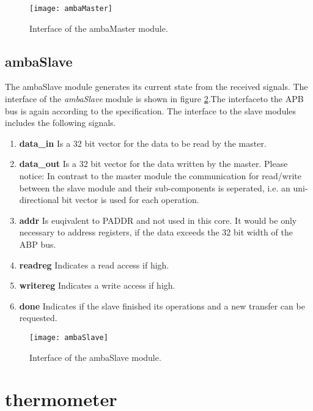 \documentclass[%
	a4paper,
]
{article}
\begin{document}
\begin{figure}[h!]
	\centering
	\texttt{[image: ambaMaster]}
	\caption{Interface of the ambaMaster module.}
	\label{fig:ambaMaster}
\end{figure}

\subsection{ambaSlave}
The ambaSlave module generates its current state from the received signals. The interface of the \textit{ambaSlave} module is shown in figure \ref{fig:ambaSlave}.The interfaceto the APB bus is again according to the specification. The interface to the slave modules includes the following signals.
\begin{enumerate}
	\item{\textbf{data_in}} Is a 32 bit vector for the data to be read by the master. 
	\item{\textbf{data_out}} Is a 32 bit vector for the data written by the master. Please notice: In contrast to the master module the communication for read/write between the slave module and their sub-components is seperated, i.e. an uni-directional bit vector is used for each operation.
	\item{\textbf{addr}} Is euqivalent to PADDR and not used in this core. It would be only necessary to address registers, if the data exceeds the 32 bit width of the ABP bus.
	\item{\textbf{readreg}} Indicates a read access if high.
	\item{\textbf{writereg}} Indicates a write access if high.
	\item{\textbf{done}} Indicates if the slave finished its operations and a new transfer can be requested.
\end{enumerate}

\begin{figure}[h!]
	\centering
	\texttt{[image: ambaSlave]}
	\caption{Interface of the ambaSlave module.}
	\label{fig:ambaSlave}
\end{figure}

\section{thermometer}
\end{document}
